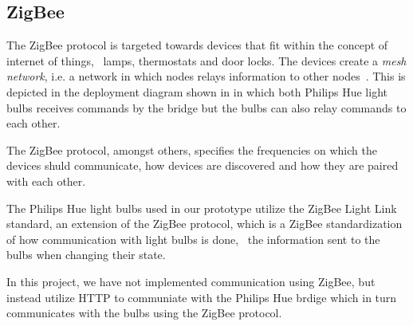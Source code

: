 \subsection{ZigBee}

The ZigBee protocol is targeted towards devices that fit within the concept of internet of things, \eg~lamps, thermostats and door locks. The devices create a \emph{mesh network}, i.e. a network in which nodes relays information to other nodes~\cite{zigbee:zigbee-pro}. This is depicted in the deployment diagram shown in  in which both Philips Hue light bulbs receives commands by the bridge but the bulbs can also relay commands to each other.

The ZigBee protocol, amongst others, specifies the frequencies on which the devices shuld communicate, how devices are discovered and how they are paired with each other.

The Philips Hue light bulbs used in our prototype utilize the ZigBee Light Link standard, an extension of the ZigBee protocol, which is a ZigBee standardization of how communication with light bulbs is done, \eg~the information sent to the bulbs when changing their state.

In this project, we have not implemented communication using ZigBee, but instead utilize HTTP to communiate with the Philips Hue brdige which in turn communicates with the bulbs using the ZigBee protocol.

